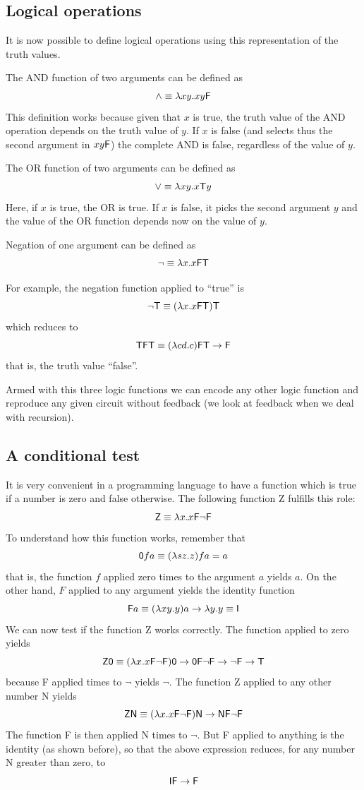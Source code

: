 \documentclass[12pt]{article}
\begin{document}
\subsection{Logical operations}
It is now possible to define logical operations using this representation of the truth values.

The {\sf AND} function of two arguments can be defined as
$${\sf \wedge} \equiv \lambda xy.xy {\sf F}$$ 
This definition works because given that $x$ is true, the truth value of the AND operation depends on the truth value of $y$. If $x$ is false (and selects thus the second argument in $xy{\sf F}$) the complete AND is false, regardless of the value of $y$.

The {\sf OR} function of two arguments can be defined as 
$${\sf \vee} \equiv \lambda xy.x {\sf T} y$$
Here, if $x$ is true, the OR is true. If $x$ is false, it picks the second argument $y$ and the value of the OR function depends now on the value of $y$.


Negation of one argument can be defined as 
$$\neg \equiv \lambda x.x {\sf FT}$$


For example, the negation function applied to ``true'' is 
$$\neg{\sf T}\equiv (\lambda x.x {\sf F}{\sf T}){\sf T}$$ which reduces to $${\sf TFT}\equiv (\lambda cd.c){\sf F}{\sf T}\rightarrow {\sf F}$$ that is, the truth value ``false''.

Armed with this three logic functions we can encode any other logic function and reproduce any given circuit without feedback (we look at feedback when we deal with recursion).

\subsection{A conditional test}

It is very convenient in a programming language to have a function which is true if a number is zero and false otherwise. The following function {\sf Z} fulfills this role:
$${\sf Z}\equiv \lambda x.x {\sf F} \neg {\sf F}$$ To understand how this function works, remember that 
$${\sf 0} fa\equiv (\lambda sz.z) fa=a$$ that is, the function $f$ applied zero times to the argument $a$ yields $a$. On the other hand, $F$ applied to any argument yields the identity function
$${\sf F}a\equiv (\lambda xy.y)a \rightarrow \lambda y.y\equiv {\sf I}$$
We can now test if the function {\sf Z} works correctly. The function applied to zero yields
$${\sf Z0} \equiv (\lambda x.x {\sf F} \neg {\sf F}){\sf 0} \rightarrow {\sf 0F}\neg{\sf F} \rightarrow \neg{\sf F} \rightarrow {\sf T}$$ because {\sf F} applied {} times to $\neg$ yields $\neg$. The function {\sf Z} applied to any other number {\sf N} yields
$${\sf ZN}\equiv (\lambda x.x{\sf F}\neg{\sf F}){\sf N} \rightarrow {\sf NF}\neg{\sf F} $$ 
The function {\sf F} is then applied {\sf N} times to $\neg$. But {\sf F} applied to anything is the identity (as shown before), so that the above expression reduces, for any number {\sf N} greater than zero, to $${\sf IF} \rightarrow {\sf F}$$
\end{document}
